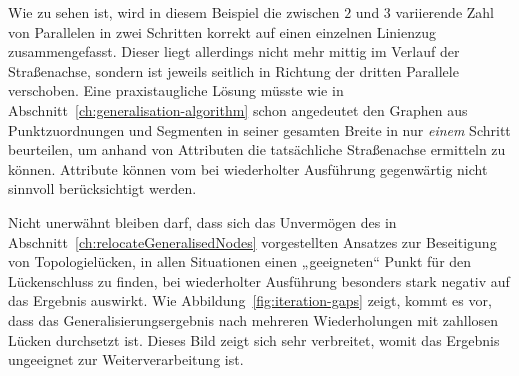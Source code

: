 \documentclass[../main/thesis.tex]{subfiles}
\begin{document}

Wie zu sehen ist, wird in diesem Beispiel die zwischen $2$ und $3$ variierende Zahl von Parallelen in zwei Schritten korrekt auf einen einzelnen Linienzug zusammengefasst.
Dieser liegt allerdings nicht mehr mittig im Verlauf der Straßenachse, sondern ist jeweils seitlich in Richtung der dritten Parallele verschoben.
Eine praxistaugliche Lösung müsste wie in Abschnitt~\ref{ch:generalisation-algorithm} schon angedeutet den Graphen aus Punktzuordnungen und Segmenten in seiner gesamten Breite in nur \emph{einem} Schritt beurteilen, um anhand von Attributen die tatsächliche Straßenachse ermitteln zu können.
Attribute können vom  bei wiederholter Ausführung gegenwärtig nicht sinnvoll berücksichtigt werden.

Nicht unerwähnt bleiben darf, dass sich das Unvermögen des in Abschnitt~\ref{ch:relocateGeneralisedNodes} vorgestellten Ansatzes zur Beseitigung von Topologielücken, in allen Situationen einen „geeigneten“ Punkt für den Lückenschluss zu finden, bei wiederholter Ausführung besonders stark negativ auf das Ergebnis auswirkt.
Wie Abbildung~\ref{fig:iteration-gaps} zeigt, kommt es vor, dass das Generalisierungsergebnis nach mehreren Wiederholungen mit zahllosen Lücken durchsetzt ist.
Dieses Bild zeigt sich sehr verbreitet, womit das Ergebnis ungeeignet zur Weiterverarbeitung ist.
\end{document}
